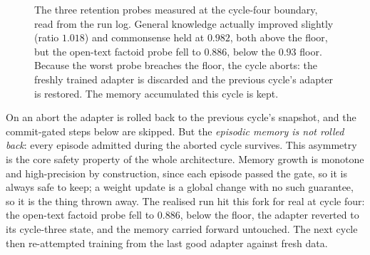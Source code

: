 \begin{figure}[htbp]
\centering
{}
\caption[The retention guard firing at cycle four]{The three retention probes measured
at the cycle-four boundary, read from the run log. General knowledge actually improved
slightly (ratio $1.018$) and commonsense held at $0.982$, both above the floor, but the
open-text factoid probe fell to $0.886$, below the $0.93$ floor. Because the worst probe
breaches the floor, the cycle aborts: the freshly trained adapter is discarded and the
previous cycle's adapter is restored. The memory accumulated this cycle is kept.}
\label{fig:cycle-guard}
\end{figure}

\begin{precise}
On an abort the adapter is rolled back to the previous cycle's snapshot, and the
commit-gated steps below are skipped. But the \emph{episodic memory is not rolled back}:
every episode admitted during the aborted cycle survives. This asymmetry is the core
safety property of the whole architecture. Memory growth is monotone and high-precision
by construction, since each episode passed the gate, so it is always safe to keep; a
weight update is a global change with no such guarantee, so it is the thing thrown away.
The realised run hit this fork for real at cycle four: the open-text factoid probe fell to
$0.886$, below the floor, the adapter reverted to its cycle-three state, and the memory
carried forward untouched. The next cycle then re-attempted training from the last good
adapter against fresh data.
\end{precise}

